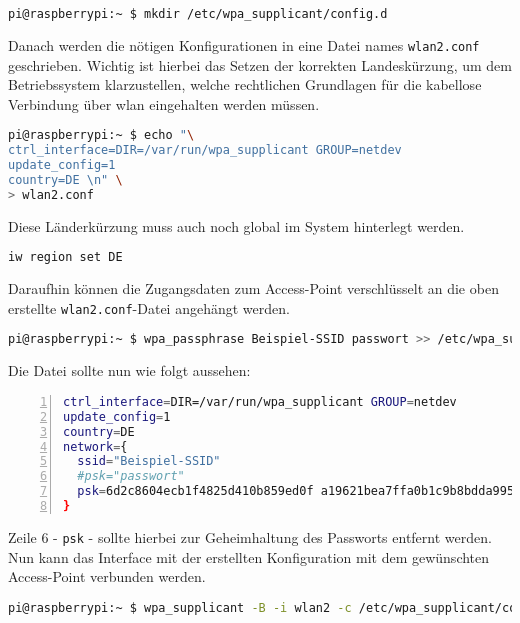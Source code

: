 \begin{lstlisting}[language=Bash]
pi@raspberrypi:~ $ mkdir /etc/wpa_supplicant/config.d
\end{lstlisting}

\noindent Danach werden die nötigen Konfigurationen in eine Datei names \texttt{wlan2.conf} geschrieben.
Wichtig ist hierbei das Setzen der korrekten Landeskürzung, um dem Betriebssystem klarzustellen, welche rechtlichen Grundlagen
für die kabellose Verbindung über \gls{wlan} eingehalten werden müssen.

\begin{lstlisting}[language=Bash]
pi@raspberrypi:~ $ echo "\
ctrl_interface=DIR=/var/run/wpa_supplicant GROUP=netdev
update_config=1
country=DE \n" \
> wlan2.conf
\end{lstlisting}

\noindent Diese Länderkürzung muss auch noch global im System hinterlegt werden.

\begin{lstlisting}[language=Bash]
iw region set DE
\end{lstlisting}

\noindent Daraufhin können die Zugangsdaten zum Access-Point verschlüsselt an die oben erstellte \texttt{wlan2.conf}-Datei angehängt werden.

\begin{lstlisting}[language=Bash]
pi@raspberrypi:~ $ wpa_passphrase Beispiel-SSID passwort >> /etc/wpa_supplicant/conf.d/wlan2.conf
\end{lstlisting}

\noindent Die Datei sollte nun wie folgt aussehen:

\begin{lstlisting}[language=Bash,numbers=left,xleftmargin=\dimexpr2.5em-1pt,framexleftmargin=2em]
ctrl_interface=DIR=/var/run/wpa_supplicant GROUP=netdev
update_config=1
country=DE
network={
  ssid="Beispiel-SSID"
  #psk="passwort"
  psk=6d2c8604ecb1f4825d410b859ed0f a19621bea7ffa0b1c9b8bdda995c7135c20
}
\end{lstlisting}

\noindent Zeile \num{6} - \texttt{psk} - sollte hierbei zur Geheimhaltung des Passworts entfernt werden.
Nun kann das Interface mit der erstellten Konfiguration mit dem gewünschten Access-Point verbunden werden.

\begin{lstlisting}[language=Bash]
pi@raspberrypi:~ $ wpa_supplicant -B -i wlan2 -c /etc/wpa_supplicant/conf.d/wlan2.conf
\end{lstlisting}


